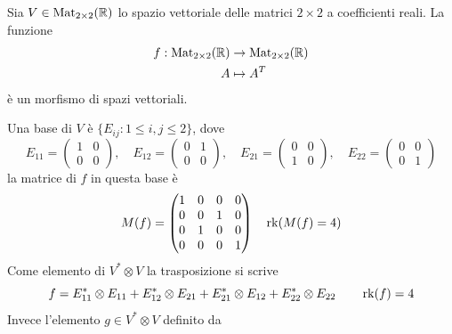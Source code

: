 \documentclass[../main.tex]{subfiles}
\begin{document}
\begin{example}
    Sia $V \in \operatorname{Mat}_{2 \times 2}(\mathbb{R})$ lo spazio vettoriale delle matrici $2 \times 2$ a coefficienti reali. La funzione
    \begin{align*}
        f: \operatorname{Mat}_{2 \times 2}(\mathbb{R}) & \rightarrow \operatorname{Mat}_{2 \times 2}(\mathbb{R}) \\
        A                                & \mapsto A^T
    \end{align*}
    è un morfismo di spazi vettoriali.

    Una base di $V$ è $\{E_{ij} : 1 \leq i,j \leq 2\}$, dove
    \begin{equation*}
        E_{11} = \begin{pmatrix}
            1 & 0 \\
            0 & 0
        \end{pmatrix}, \quad
        E_{12} = \begin{pmatrix}
            0 & 1 \\
            0 & 0
        \end{pmatrix}, \quad
        E_{21} = \begin{pmatrix}
            0 & 0 \\
            1 & 0
        \end{pmatrix}, \quad
        E_{22} = \begin{pmatrix}
            0 & 0 \\
            0 & 1
        \end{pmatrix}
    \end{equation*}
    la matrice di $f$ in questa base è
    \begin{equation*}
        M(f) = \begin{pmatrix}
            1 & 0 & 0 & 0 \\
            0 & 0 & 1 & 0 \\
            0 & 1 & 0 & 0 \\
            0 & 0 & 0 & 1
        \end{pmatrix} \quad \operatorname{rk}(M(f) = 4)
    \end{equation*}
    Come elemento di $V^* \otimes V$ la trasposizione si scrive
    \begin{equation*}
        f = E_{11}^* \otimes E_{11} + E_{12}^* \otimes E_{21} + E_{21}^* \otimes E_{12} + E_{22}^* \otimes E_{22} \qquad \operatorname{rk}(f) = 4
    \end{equation*}
    Invece l'elemento $g \in V^* \otimes V$ definito da
    \begin{align*}

\end{align*}
\end{example}
\end{document}
